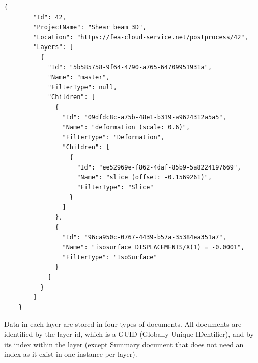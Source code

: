 \begin{lstlisting}[style=json,caption=Example of solution.json document.,label=lst:solution.json]
    {
        "Id": 42,
        "ProjectName": "Shear beam 3D",
        "Location": "https://fea-cloud-service.net/postprocess/42",
        "Layers": [
          {
            "Id": "5b585758-9f64-4790-a765-64709951931a",
            "Name": "master",
            "FilterType": null,
            "Children": [
              {
                "Id": "09dfdc8c-a75b-48e1-b319-a9624312a5a5",
                "Name": "deformation (scale: 0.6)",
                "FilterType": "Deformation",
                "Children": [
                  {
                    "Id": "ee52969e-f862-4daf-85b9-5a8224197669",
                    "Name": "slice (offset: -0.1569261)",
                    "FilterType": "Slice"
                  }
                ]
              },
              {
                "Id": "96ca950c-0767-4439-b57a-35384ea351a7",
                "Name": "isosurface DISPLACEMENTS/X(1) = -0.0001",
                "FilterType": "IsoSurface"
              }
            ]
          }
        ]
    }
    \end{lstlisting}

\vspace{5mm}

Data in each layer are stored in four types of documents. All documents are identified by the layer id, which is a GUID (Globally Unique IDentifier), and by its index within the layer (except Summary document that does not need an index as it exist in one instance per layer).

